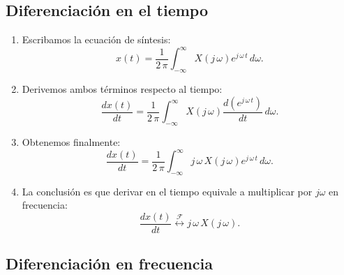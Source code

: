 \documentclass[11pt,a4paper,openany]{book}
\begin{document}
\subsection{Diferenciación en el tiempo}

\begin{enumerate}
	\item Escribamos la ecuación de síntesis:
	\begin{equation}
		x(t) = \frac{1}{2 \, \pi} \int_{-\infty}^{\infty} X(j \, \omega) e^{j \, \omega \, t} \, d\omega .
	\end{equation}
	
	\item Derivemos ambos términos respecto al tiempo:
	\begin{equation}
		\frac{dx(t)}{dt} = \frac{1}{2 \, \pi} \int_{-\infty}^{\infty} X(j \, \omega) \frac{d(e^{j \, \omega \, t})}{dt} \, d\omega.
	\end{equation}
	
	\item Obtenemos finalmente:
	\begin{equation}
		\frac{dx(t)}{dt} = \frac{1}{2 \, \pi} \int_{-\infty}^{\infty} j \, \omega \, X(j \, \omega) e^{j \, \omega \, t} \, d\omega.
	\end{equation}
	
	\item La conclusión es que derivar en el tiempo equivale a multiplicar por $j\omega$ en frecuencia:
	\begin{equation}
		\frac{dx(t)}{dt} \stackrel{\mathcal{F}}{\longleftrightarrow} j \, \omega \, X(j \, \omega) .
	\end{equation}
	
\end{enumerate}

\subsection{Diferenciación en frecuencia}
\end{document}
